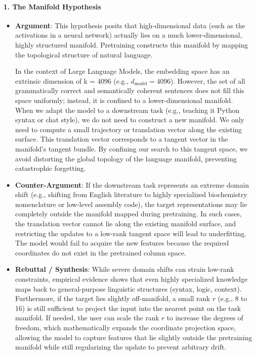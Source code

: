 \documentclass{article}
\begin{document}
\paragraph{1. The Manifold Hypothesis}
\begin{itemize}
  \item \textbf{Argument}: This hypothesis posits that high-dimensional data (such as the activations in a neural network) actually lies on a much lower-dimensional, highly structured manifold. Pretraining constructs this manifold by mapping the topological structure of natural language.
  
  In the context of Large Language Models, the embedding space has an extrinsic dimension of k = 4096 (e.g., $d_{\text{model}} = 4096$). However, the set of all grammatically correct and semantically coherent sentences does not fill this space uniformly; instead, it is confined to a lower-dimensional manifold. When we adapt the model to a downstream task (e.g., teaching it Python syntax or chat style), we do not need to construct a new manifold. We only need to compute a small trajectory or translation vector along the existing surface. This translation vector corresponds to a tangent vector in the manifold's tangent bundle. By confining our search to this tangent space, we avoid distorting the global topology of the language manifold, preventing catastrophic forgetting.
  
  \item \textbf{Counter-Argument}: If the downstream task represents an extreme domain shift (e.g., shifting from English literature to highly specialized biochemistry nomenclature or low-level assembly code), the target representations may lie completely outside the manifold mapped during pretraining. In such cases, the translation vector cannot lie along the existing manifold surface, and restricting the updates to a low-rank tangent space will lead to underfitting. The model would fail to acquire the new features because the required coordinates do not exist in the pretrained column space.
  
  \item \textbf{Rebuttal / Synthesis}: While severe domain shifts can strain low-rank constraints, empirical evidence shows that even highly specialized knowledge maps back to general-purpose linguistic structures (syntax, logic, context). Furthermore, if the target lies slightly off-manifold, a small rank $r$ (e.g., 8 to 16) is still sufficient to project the input into the nearest point on the task manifold. If needed, the user can scale the rank $r$ to increase the degrees of freedom, which mathematically expands the coordinate projection space, allowing the model to capture features that lie slightly outside the pretraining manifold while still regularizing the update to prevent arbitrary drift.
\end{itemize}
\end{document}
